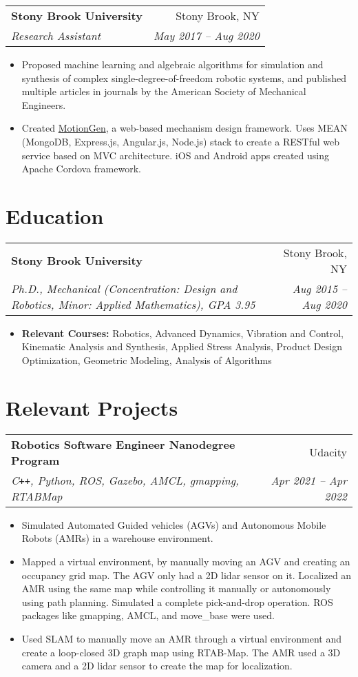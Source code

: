 \documentclass[letterpaper,10pt]{article}
\makeatletter
\newcommand{\resumeHeading}[4]{
  \vspace{-1pt}
    \begin{tabular*}{0.97\textwidth}{l@{\extracolsep{\fill}}r}
      \textbf{#1} & #2 \vspace{-2pt}\\ \vspace{1pt}
      \textit{\small#3} & \textit{\small #4} \\
    \end{tabular*}
}
\newcommand{\resumeSection}[1]{
\vspace{-12pt}
\section{\textbf{#1}}
}
\newcommand{\resumeItemListStart}{
\vspace{-6pt}
\begin{itemize}[leftmargin=14pt]
}
\newcommand{\resumeItemListEnd}{
\vspace{+6pt}
\end{itemize}
}
\newcommand{\resumeItem}[1]{
  \linespread{.95}
  \selectfont
  \item\small{
      {#1 \vspace{-7pt}
      }
  }
  \linespread{1}
  \selectfont
}
\makeatother
\begin{document}
\resumeHeading
{Stony Brook University}{Stony Brook, NY}
{Research Assistant}{May 2017 -- Aug 2020}
\resumeItemListStart
\resumeItem{Proposed machine learning and algebraic algorithms for simulation and synthesis of complex single-degree-of-freedom robotic systems, and published multiple articles in journals by the American Society of Mechanical Engineers.}
\resumeItem{Created \href{http://cadcam.eng.sunysb.edu/}{MotionGen}, a web-based mechanism design framework. Uses MEAN (MongoDB, Express.js, Angular.js, Node.js) stack to create a RESTful web service based on MVC architecture. iOS and Android apps created using Apache Cordova framework.}
\resumeItemListEnd
	


\resumeSection{Education}
\resumeHeading
{Stony Brook University}{Stony Brook, NY}
{Ph.D., Mechanical (Concentration: Design and Robotics, Minor: Applied Mathematics), GPA 3.95}{Aug 2015 -- Aug 2020}
\resumeItemListStart
\resumeItem{\textbf{Relevant Courses:} Robotics, Advanced Dynamics, Vibration and Control, Kinematic Analysis and Synthesis,  Applied Stress Analysis, Product Design Optimization, Geometric Modeling, Analysis of Algorithms}
\resumeItemListEnd



\resumeSection{Relevant Projects}
    
    \resumeHeading{Robotics Software Engineer Nanodegree Program}{Udacity}{C\texttt{++}, Python, ROS, Gazebo, AMCL, gmapping, RTABMap}{Apr 2021 -- Apr 2022}
    \resumeItemListStart
    \resumeItem{Simulated Automated Guided vehicles (AGVs) and Autonomous Mobile Robots (AMRs) in a warehouse environment.}
    \resumeItem{Mapped a virtual environment, by manually moving an AGV and creating an occupancy grid map. The AGV only had a 2D lidar sensor on it. Localized an AMR using the same map while controlling it manually or autonomously using path planning. Simulated a complete pick-and-drop operation. ROS packages like gmapping, AMCL, and move\_base were used.}
    \resumeItem{Used SLAM to manually move an AMR through a virtual environment and create a loop-closed 3D graph map using RTAB-Map. The AMR used a 3D camera and a 2D lidar sensor to create the map for localization.}
    \resumeItemListEnd
    
\end{document}
